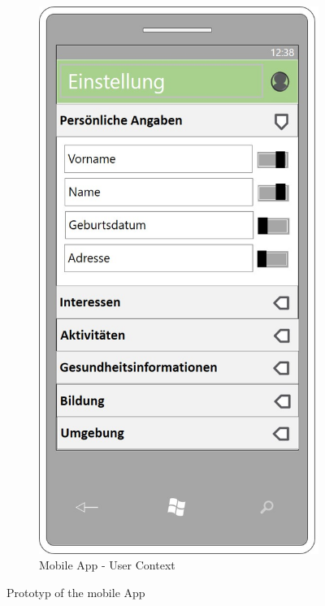 \begin{figure}[!ht]
\begin{subfigure}{0.32\linewidth}
	\end{subfigure}
	\begin{subfigure}{0.32\linewidth}
		\centering
		\includegraphics[width=1\linewidth]{Picture/App-Kontext}
		\caption{Mobile App - User Context}
		\label{fig:prototyp3}
	\end{subfigure}%
	\caption{Prototyp of the mobile App}
	\label{fig:prototyp}
\end{figure}











